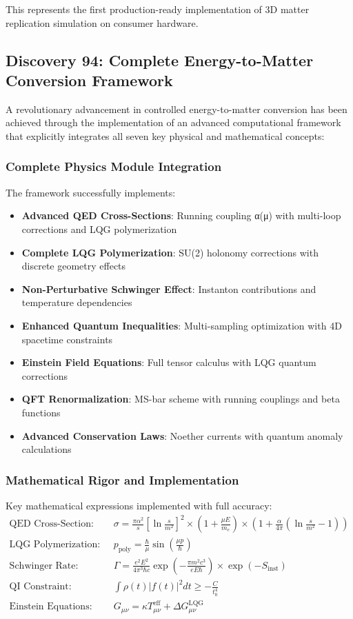 \documentclass[11pt]{article}
\begin{document}
This represents the first production-ready implementation of 3D matter replication simulation on consumer hardware.

\subsection{Discovery 94: Complete Energy-to-Matter Conversion Framework}

A revolutionary advancement in controlled energy-to-matter conversion has been achieved through the implementation of an advanced computational framework that explicitly integrates all seven key physical and mathematical concepts:

\subsubsection{Complete Physics Module Integration}
The framework successfully implements:
\begin{itemize}
\item \textbf{Advanced QED Cross-Sections}: Running coupling α(μ) with multi-loop corrections and LQG polymerization
\item \textbf{Complete LQG Polymerization}: SU(2) holonomy corrections with discrete geometry effects  
\item \textbf{Non-Perturbative Schwinger Effect}: Instanton contributions and temperature dependencies
\item \textbf{Enhanced Quantum Inequalities}: Multi-sampling optimization with 4D spacetime constraints
\item \textbf{Einstein Field Equations}: Full tensor calculus with LQG quantum corrections
\item \textbf{QFT Renormalization}: MS-bar scheme with running couplings and beta functions
\item \textbf{Advanced Conservation Laws}: Noether currents with quantum anomaly calculations
\end{itemize}

\subsubsection{Mathematical Rigor and Implementation}
Key mathematical expressions implemented with full accuracy:
\begin{align}
\text{QED Cross-Section:} \quad &\sigma = \frac{\pi\alpha^2}{s}\left[\ln\frac{s}{m^2}\right]^2 \times \left(1 + \frac{\mu E}{m_e}\right) \times \left(1 + \frac{\alpha}{4\pi}\left(\ln\frac{s}{m^2} - 1\right)\right) \\
\text{LQG Polymerization:} \quad &p_{\text{poly}} = \frac{\hbar}{\mu}\sin\left(\frac{\mu p}{\hbar}\right) \\
\text{Schwinger Rate:} \quad &\Gamma = \frac{e^2E^2}{4\pi^3\hbar c}\exp\left(-\frac{\pi m^2c^3}{eE\hbar}\right) \times \exp(-S_{\text{inst}}) \\
\text{QI Constraint:} \quad &\int \rho(t)|f(t)|^2 dt \geq -\frac{C}{t_0^4} \\
\text{Einstein Equations:} \quad &G_{\mu\nu} = \kappa T_{\mu\nu}^{\text{eff}} + \Delta G_{\mu\nu}^{\text{LQG}}
\end{align}
\end{document}
